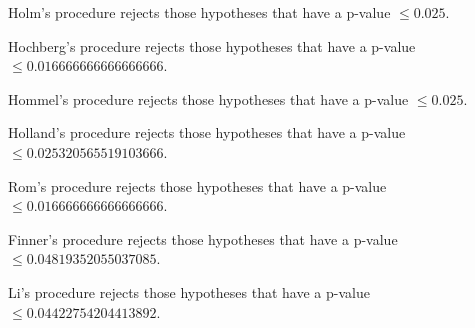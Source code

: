 \documentclass[a4paper,10pt]{article}
\begin{document}
\begin{landscape}
Holm's procedure rejects those hypotheses that have a p-value $\le0.025$.


Hochberg's procedure rejects those hypotheses that have a p-value $\le0.016666666666666666$.


Hommel's procedure rejects those hypotheses that have a p-value $\le0.025$.


Holland's procedure rejects those hypotheses that have a p-value $\le0.025320565519103666$.


Rom's procedure rejects those hypotheses that have a p-value $\le0.016666666666666666$.


Finner's procedure rejects those hypotheses that have a p-value $\le0.04819352055037085$.


Li's procedure rejects those hypotheses that have a p-value $\le0.04422754204413892$.



\newpage


\end{landscape}
\end{document}
